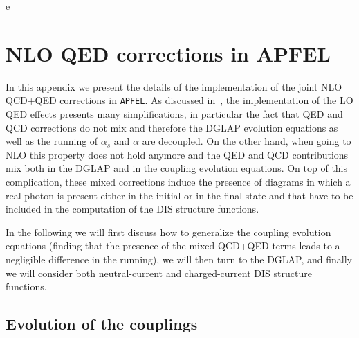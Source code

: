 e\appendix

\section{NLO QED corrections in APFEL} \label{sec:appendixAPFEL}

In this appendix we present the details of the implementation of the
joint NLO QCD+QED corrections in {\tt APFEL}.
%
As discussed in~\cite{Bertone:2013vaa}, the implementation of the LO
QED effects presents many simplifications, in particular the fact that
QED and QCD corrections do not mix and therefore the DGLAP evolution
equations as well as the running of $\alpha_s$ and $\alpha$ are
decoupled.
%
On the other hand, when going to NLO this property does not hold
anymore and the QED and QCD contributions mix both in the DGLAP and in
the coupling evolution equations.
%
On top of this complication, these mixed corrections induce the
presence of diagrams in which a real photon is present either in the
initial or in the final state and that have to be included in the
computation of the DIS structure functions.

In the following we will first discuss how to generalize the coupling
evolution equations (finding that the presence of the mixed QCD+QED
terms leads to a negligible difference in the running), we will then
turn to the DGLAP, and finally we will consider both neutral-current
and charged-current DIS structure functions.

\subsection{Evolution of the couplings}

